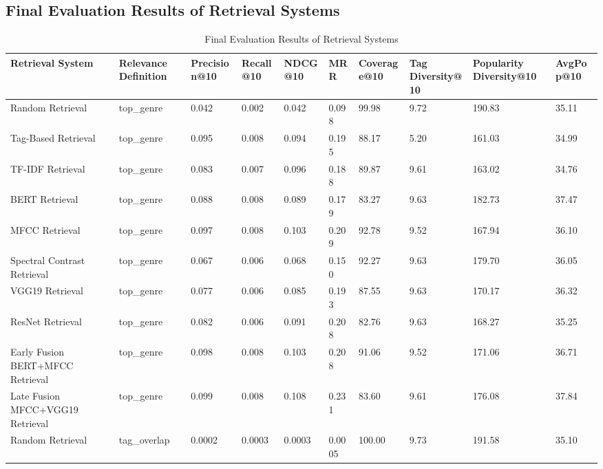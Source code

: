 \documentclass[sigconf]{acmart}
\begin{document}
\begin{landscape} %
\section{Final Evaluation Results of Retrieval Systems}
\label{app:full_evaluation_results}

\begin{table}[H]
    \centering
    \caption{Final Evaluation Results of Retrieval Systems}
    \label{tab:final_evaluation_results_appendix}
    \footnotesize
    \begin{tabularx}{\linewidth}{l l *{8}{Y}}
        \toprule
        \textbf{Retrieval System} & \textbf{Relevance Definition} & \textbf{Precision@10} & \textbf{Recall@10} & \textbf{NDCG@10} & \textbf{MRR} & \textbf{Coverage@10} & \textbf{Tag Diversity@10} & \textbf{Popularity Diversity@10} & \textbf{AvgPop@10} \\
        \midrule
        Random Retrieval & top\_genre & 0.042 & 0.002 & 0.042 & 0.098 & 99.98 & 9.72 & 190.83 & 35.11 \\
        Tag-Based Retrieval & top\_genre & 0.095 & 0.008 & 0.094 & 0.195 & 88.17 & 5.20 & 161.03 & 34.99 \\
        TF-IDF Retrieval & top\_genre & 0.083 & 0.007 & 0.096 & 0.188 & 89.87 & 9.61 & 163.02 & 34.76 \\
        BERT Retrieval & top\_genre & 0.088 & 0.008 & 0.089 & 0.179 & 83.27 & 9.63 & 182.73 & 37.47 \\
        MFCC Retrieval & top\_genre & 0.097 & 0.008 & 0.103 & 0.209 & 92.78 & 9.52 & 167.94 & 36.10 \\
        Spectral Contrast Retrieval & top\_genre & 0.067 & 0.006 & 0.068 & 0.150 & 92.27 & 9.63 & 179.70 & 36.05 \\
        VGG19 Retrieval & top\_genre & 0.077 & 0.006 & 0.085 & 0.193 & 87.55 & 9.63 & 170.17 & 36.32 \\
        ResNet Retrieval & top\_genre & 0.082 & 0.006 & 0.091 & 0.208 & 82.76 & 9.63 & 168.27 & 35.25 \\
        Early Fusion BERT+MFCC Retrieval & top\_genre & 0.098 & 0.008 & 0.103 & 0.208 & 91.06 & 9.52 & 171.06 & 36.71 \\
        Late Fusion MFCC+VGG19 Retrieval & top\_genre & 0.099 & 0.008 & 0.108 & 0.231 & 83.60 & 9.61 & 176.08 & 37.84 \\
        \addlinespace
        Random Retrieval & tag\_overlap & 0.0002 & 0.0003 & 0.0003 & 0.0005 & 100.00 & 9.73 & 191.58 & 35.10 \\

\end{tabularx}
\end{table}
\end{landscape}
\end{document}
